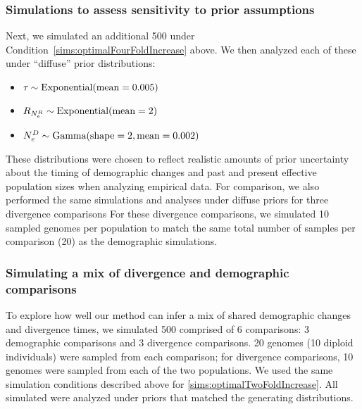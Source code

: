 \subsubsection{Simulations to assess sensitivity to prior assumptions}


Next, we simulated an additional 500 \datasets under
Condition~\ref{sims:optimalFourFoldIncrease} above.
We then analyzed each of these \datasets under ``diffuse'' prior
distributions:
\begin{itemize}
    \item $\etime \sim \dexponential{0.005}$
    \item $\rootrelativepopsize \sim \dexponential{2}$
    \item $\epopsize[\descendantpopindex{}] \sim \dgamma{2}{0.002}$
\end{itemize}
These distributions were chosen to reflect realistic amounts of prior
uncertainty about the timing of demographic changes and past and present
effective population sizes when analyzing empirical data.
For comparison, we also performed the same simulations and analyses under
diffuse priors for three divergence comparisons
For these divergence comparisons, we simulated 10 sampled genomes per
population to match the same total number of samples per comparison (20) as the
demographic simulations.


\subsubsection{Simulating a mix of divergence and demographic comparisons}

To explore how well our method can infer a mix of shared demographic changes
and divergence times, we simulated 500 \datasets comprised of 6 comparisons:
3 demographic comparisons and
3 divergence comparisons.
20 genomes (10 diploid individuals) were sampled from each comparison; for
divergence comparisons, 10 genomes were sampled from each of the two
populations.
We used the same simulation conditions described above for
\ref{sims:optimalTwoFoldIncrease}.
All simulated \datasets were analyzed under priors that matched
the generating distributions.


